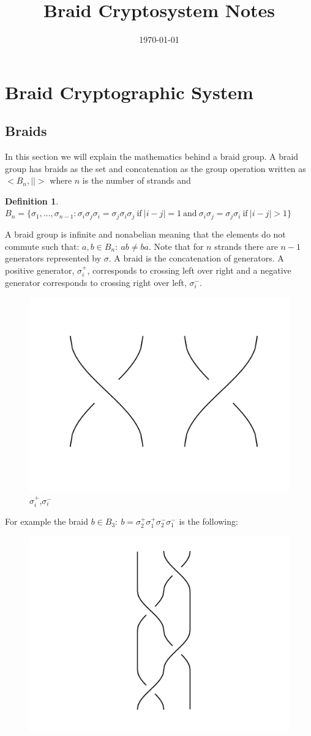\documentclass{article}
\title{Braid Cryptosystem Notes}
\date{\today}
\theoremstyle{definition}
\newtheorem{definition}{Definition}[section]
\begin{document}
	\maketitle
	
	\section{Braid Cryptographic System}
	
	\subsection{Braids}
	In this section we will explain the mathematics behind a braid group. A braid group has braids as the set and concatenation as the group operation written as $<B_n,||>$ where $n$ is the number of strands and 

\begin{definition} 
$B_n=\{\sigma_1,...,\sigma_{n-1}:\sigma_i\sigma_j\sigma_i=\sigma_j\sigma_i\sigma_j\ \textrm{if}\ |i-j|=1\ \textrm{and}\ \sigma_i\sigma_j=\sigma_j\sigma_i\ \textrm{if}\ |i-j|>1\}$
\end{definition}
 
A braid group is infinite and nonabelian meaning that the elements do not commute such that:
$a,b \in B_n: \ ab\neq ba$. Note that for $n$ strands there are $n-1$ generators represented by $\sigma$. A braid is the concatenation of generators. A positive generator, $\sigma_i^+$, corresponds to crossing left over right and a negative generator corresponds to crossing right over left, $\sigma_i^-$. 

\begin{figure}[hbp!]
\centering
  \includegraphics[width=0.2\linewidth]{./Pictures/gen_pos_neg.png}
  \caption{$\sigma_i^+$,$\sigma_i^-$}\label{fig:graph}
\end{figure}


For example the braid $b \in B_3: \ b=\sigma_2^+ \sigma_1^+ \sigma_2^- \sigma_1^-$ is the following:
	
	\begin{figure}[hbp!]
\centering
  \includegraphics[width=0.2\linewidth]{./Pictures/example_braid.png}
\end{figure}
	
\end{document}
